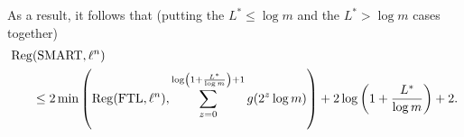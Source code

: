 As a result, it follows that (putting the $L^* \le \log m$ and the $L^* > \log m$ cases together) 
\begin{align}
\mathrm{Reg}&(\text{SMART}, \ell^n)  \nonumber\\
&\leq 2 \min\left(\mathrm{Reg}(\text{FTL}, \ell^n), \sum_{z = 0}^{\log\left(1+\frac{L^*}{\log m}\right)+1} g(2^z \log m)\right) + 2 \log\left(1+\frac{L^*}{\log m}\right)+2.
\end{align}





